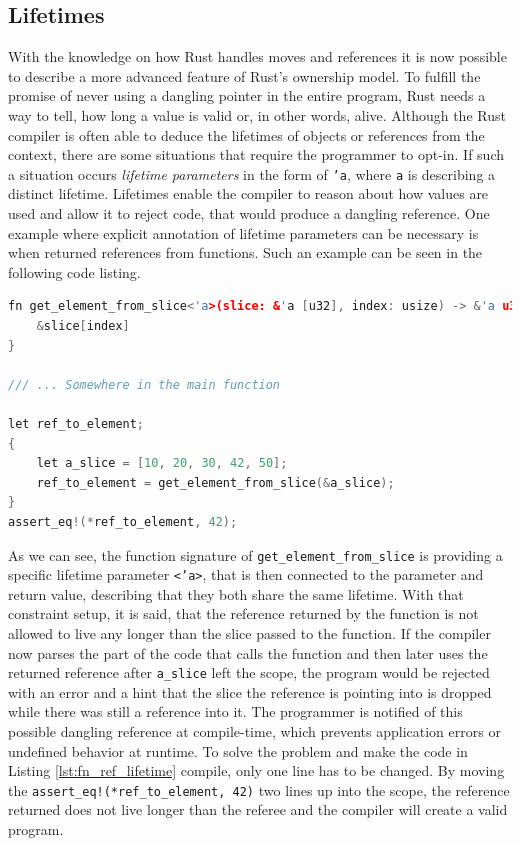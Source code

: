\subsection{Lifetimes}

With the knowledge on how Rust handles moves and references it is now possible to describe a more advanced feature of Rust's ownership model. To fulfill the promise of never using a dangling pointer in the entire program, Rust needs a way to tell, how long a value is valid or, in other words, alive. Although the Rust compiler is often able to deduce the lifetimes of objects or references from the context, there are some situations that require the programmer to opt-in. If such a situation occurs \textit{lifetime parameters} in the form of \texttt{'a}, where \texttt{a} is describing a distinct lifetime. Lifetimes enable the compiler to reason about how values are used and allow it to reject code, that would produce a dangling reference. One example where explicit annotation of lifetime parameters can be necessary is when returned references from functions. Such an example can be seen in the following code listing.\\

\begin{lstlisting}[caption={Returning a reference from a function, needing an explicit lifetime annotation. Compilation error because of a possible dangling reference.}, label={lst:fn_ref_lifetime}, language=C++]
fn get_element_from_slice<'a>(slice: &'a [u32], index: usize) -> &'a u32 {
	&slice[index]
}

/// ... Somewhere in the main function

let ref_to_element;
{
	let a_slice = [10, 20, 30, 42, 50];
	ref_to_element = get_element_from_slice(&a_slice);
}
assert_eq!(*ref_to_element, 42);

\end{lstlisting}

\noindent
As we can see, the function signature of \texttt{get\_element\_from\_slice} is providing a specific lifetime parameter \texttt{<'a>}, that is then connected to the parameter and return value, describing that they both share the same lifetime. With that constraint setup, it is said, that the reference returned by the function is not allowed to live any longer than the slice passed to the function. If the compiler now parses the part of the code that calls the function and then later uses the returned reference after \texttt{a\_slice} left the scope, the program would be rejected with an error and a hint that the slice the reference is pointing into is dropped while there was still a reference into it. The programmer is notified of this possible dangling reference at compile-time, which prevents application errors or undefined behavior at runtime. To solve the problem and make the code in Listing \ref{lst:fn_ref_lifetime} compile, only one line has to be changed. By moving the \texttt{assert\_eq!(*ref\_to\_element, 42)} two lines up into the scope, the reference returned does not live longer than the referee and the compiler will create a valid program.

